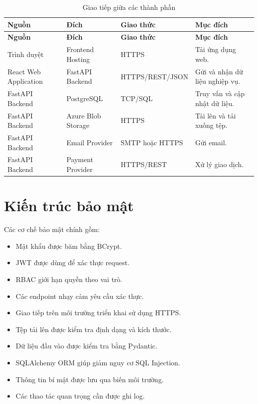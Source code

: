 \begin{longtable}{|p{3.5cm}|p{3.8cm}|p{2.8cm}|p{4.2cm}|}
\caption{Giao tiếp giữa các thành phần}
\label{tab:component-communication} \\ \hline
\textbf{Nguồn} & \textbf{Đích} & \textbf{Giao thức} & \textbf{Mục đích} \\ \hline
\endfirsthead
\hline
\textbf{Nguồn} & \textbf{Đích} & \textbf{Giao thức} & \textbf{Mục đích} \\ \hline
\endhead

Trình duyệt & Frontend Hosting & HTTPS & Tải ứng dụng web. \\ \hline
React Web Application & FastAPI Backend & HTTPS/REST/JSON & Gửi và nhận dữ liệu nghiệp vụ. \\ \hline
FastAPI Backend & PostgreSQL & TCP/SQL & Truy vấn và cập nhật dữ liệu. \\ \hline
FastAPI Backend & Azure Blob Storage & HTTPS & Tải lên và tải xuống tệp. \\ \hline
FastAPI Backend & Email Provider & SMTP hoặc HTTPS & Gửi email. \\ \hline
FastAPI Backend & Payment Provider & HTTPS/REST & Xử lý giao dịch. \\ \hline
\end{longtable}

\section{Kiến trúc bảo mật}
\label{sec:security-architecture}

Các cơ chế bảo mật chính gồm:

\begin{itemize}
    \item Mật khẩu được băm bằng BCrypt.
    \item JWT được dùng để xác thực request.
    \item RBAC giới hạn quyền theo vai trò.
    \item Các endpoint nhạy cảm yêu cầu xác thực.
    \item Giao tiếp trên môi trường triển khai sử dụng HTTPS.
    \item Tệp tải lên được kiểm tra định dạng và kích thước.
    \item Dữ liệu đầu vào được kiểm tra bằng Pydantic.
    \item SQLAlchemy ORM giúp giảm nguy cơ SQL Injection.
    \item Thông tin bí mật được lưu qua biến môi trường.
    \item Các thao tác quan trọng cần được ghi log.
\end{itemize}


